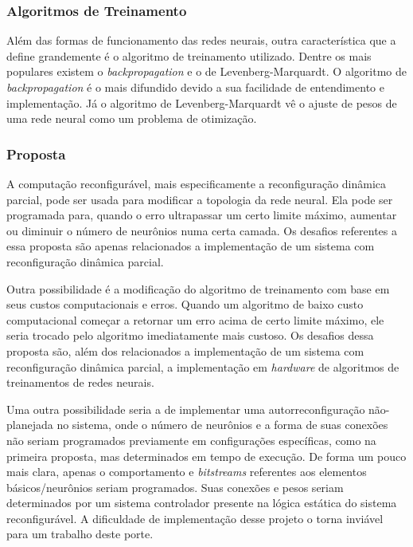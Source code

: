 \subsubsection{Algoritmos de Treinamento}
Al\'em das formas de funcionamento das redes neurais, outra característica que a define grandemente \'e o algoritmo de treinamento utilizado.
Dentre os mais populares existem o \textit{backpropagation} e o de Levenberg-Marquardt.
O algoritmo de \textit{backpropagation} \'e o mais difundido devido a sua facilidade de entendimento e implementa\c{c}\~ao.
J\'a o algoritmo de Levenberg-Marquardt vê o ajuste de pesos de uma rede neural como um problema de otimiza\c{c}\~ao.

\subsubsection{Proposta}
A computa\c{c}\~ao reconfigur\'avel, mais especificamente a reconfigura\c{c}\~ao dinâmica parcial, pode ser usada para modificar a topologia da rede neural.
Ela pode ser programada para, quando o erro ultrapassar um certo limite m\'aximo, aumentar ou diminuir o n\'umero de neur\^onios numa certa camada.
Os desafios referentes a essa proposta s\~ao apenas relacionados a implementa\c{c}\~ao de um sistema com reconfigura\c{c}\~ao dinâmica parcial.

Outra possibilidade \'e a modifica\c{c}\~ao do algoritmo de treinamento com base em seus custos computacionais e erros.
Quando um algoritmo de baixo custo computacional come\c{c}ar a retornar um erro acima de certo limite m\'aximo, ele seria trocado pelo algoritmo imediatamente mais custoso.
Os desafios dessa proposta s\~ao, al\'em dos relacionados a implementa\c{c}\~ao de um sistema com reconfigura\c{c}\~ao dinâmica parcial, a implementa\c{c}\~ao em \textit{hardware} de algoritmos de treinamentos de redes neurais.

Uma outra possibilidade seria a de implementar uma autorreconfigura\c{c}\~ao n\~ao-planejada no sistema, onde o n\'umero de neur\^onios e a forma de suas conex\~oes n\~ao seriam programados previamente em configura\c{c}\~oes específicas, como na primeira proposta, mas determinados em tempo de execu\c{c}\~ao.
De forma um pouco mais clara, apenas o comportamento e \textit{bitstreams} referentes aos elementos b\'asicos/neur\^onios seriam programados.
Suas conex\~oes e pesos seriam determinados por um sistema controlador presente na l\'ogica est\'atica do sistema reconfigur\'avel.
A dificuldade de implementa\c{c}\~ao desse projeto o torna invi\'avel para um trabalho deste porte.

